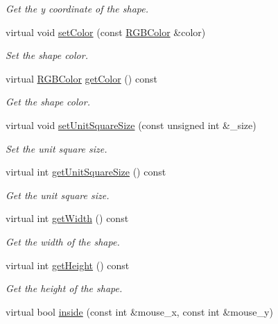 \begin{DoxyCompactItemize}
\begin{DoxyCompactList}\small\item\em Get the y coordinate of the shape. \end{DoxyCompactList}\item 
virtual void \mbox{\hyperlink{class_visible_shape_a69ae0940d090fec376bee8dc6861b8dc}{set\+Color}} (const \mbox{\hyperlink{class_r_g_b_color}{R\+G\+B\+Color}} \&color)
\begin{DoxyCompactList}\small\item\em Set the shape color. \end{DoxyCompactList}\item 
virtual \mbox{\hyperlink{class_r_g_b_color}{R\+G\+B\+Color}} \mbox{\hyperlink{class_visible_shape_a80fe773d65776d9402be26068564882d}{get\+Color}} () const
\begin{DoxyCompactList}\small\item\em Get the shape color. \end{DoxyCompactList}\item 
virtual void \mbox{\hyperlink{class_visible_shape_a52308c3c9134514fb6782c6f0e149914}{set\+Unit\+Square\+Size}} (const unsigned int \&\+\_\+size)
\begin{DoxyCompactList}\small\item\em Set the unit square size. \end{DoxyCompactList}\item 
virtual int \mbox{\hyperlink{class_visible_shape_a76955574eac9a5e205a2746b1343deb4}{get\+Unit\+Square\+Size}} () const
\begin{DoxyCompactList}\small\item\em Get the unit square size. \end{DoxyCompactList}\item 
virtual int \mbox{\hyperlink{class_visible_shape_a667b81608efd869c907bd342397f3eb5}{get\+Width}} () const
\begin{DoxyCompactList}\small\item\em Get the width of the shape. \end{DoxyCompactList}\item 
virtual int \mbox{\hyperlink{class_visible_shape_a1ce25935c729146932d649f88215ffbe}{get\+Height}} () const
\begin{DoxyCompactList}\small\item\em Get the height of the shape. \end{DoxyCompactList}\item 
virtual bool \mbox{\hyperlink{class_visible_shape_aab5199578030849314f0c6a339aa4281}{inside}} (const int \&mouse\+\_\+x, const int \&mouse\+\_\+y)

\end{DoxyCompactItemize}
